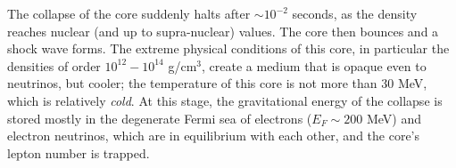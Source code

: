 
The collapse of the core suddenly halts after $\sim 10^{-2}$ seconds, as the density reaches nuclear (and up to supra-nuclear)  values. The core then bounces and a shock wave forms. The extreme physical conditions of this core, in particular the densities of order $10^{12}-10^{14}$ g/cm$^{3}$, create a medium that is opaque even to neutrinos, but cooler; the temperature of this core is not more than 30 MeV, which is relatively \emph{cold}.  At this stage, the gravitational energy of the collapse is stored mostly in the degenerate Fermi sea of electrons ($E_{F}\sim 200$ MeV) and electron neutrinos, which are in equilibrium with each other, and the core's lepton number is trapped.



